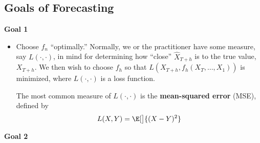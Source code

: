 \subsection*{Goals of Forecasting}
\textbf{Goal 1}
\begin{itemize}
    \item Choose $ f_n $ ``optimally.'' Normally,
          we or the practitioner have some measure, say $ L(\cdot,\cdot) $,
          in mind for determining how ``close'' $ \hat{X}_{T+h} $
          is to the true value, $ X_{T+h} $. We then wish to choose $ f_h $ so that
          $ L(X_{T+h},f_h(X_T,\ldots,X_1)) $
          is minimized, where $ L(\cdot,\cdot) $ is a loss function.

          \begin{Example}{}{}
              The most common measure of $ L(\cdot,\cdot) $ is the \textbf{mean-squared error}
              (MSE), defined by
              \[ L(X,Y)=\E[\big]{(X-Y)^2} \]
          \end{Example}
\end{itemize}
\textbf{Goal 2}
